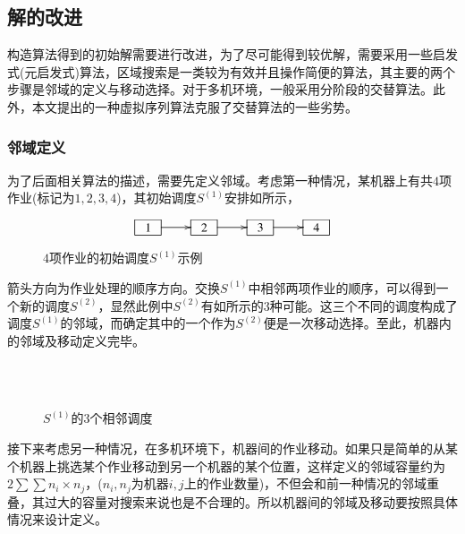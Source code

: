 \subsection{解的改进}
构造算法得到的初始解需要进行改进，为了尽可能得到较优解，需要采用一些启发式(元启发式)算法，区域搜索是一类较为有效并且操作简便的算法，其主要的两个步骤是邻域的定义与移动选择。对于多机环境，一般采用分阶段的交替算法。此外，本文提出的一种虚拟序列算法克服了交替算法的一些劣势。

\subsubsection{邻域定义}
为了后面相关算法的描述，需要先定义邻域。考虑第一种情况，某机器上有共$4$项作业(标记为$1,2,3,4$)，其初始调度$S^{(1)}$安排如所示，
\begin{figure}[h]
\begin{equation*}
\xymatrix{
\jobunit{1} \ar[r] & \jobunit{2} \ar[r] &\jobunit{3} \ar[r] &\jobunit{4}
}
\end{equation*}
\caption{$4$项作业的初始调度$S^{(1)}$示例\label{fig:4example}}
\end{figure}
箭头方向为作业处理的顺序方向。交换$S^{(1)}$中相邻两项作业的顺序，可以得到一个新的调度$S^{(2)}$，显然此例中$S^{(2)}$有如所示的$3$种可能。这三个不同的调度构成了调度$S^{(1)}$的邻域，而确定其中的一个作为$S^{(2)}$便是一次移动选择。至此，机器内的邻域及移动定义完毕。

\begin{figure}[h]
\centering
\vspace{1.5em}
\\
\\
\caption{$S^{(1)}$的$3$个相邻调度\label{fig:3neighbors}}
\end{figure}

接下来考虑另一种情况，在多机环境下，机器间的作业移动。如果只是简单的从某个机器上挑选某个作业移动到另一个机器的某个位置，这样定义的邻域容量约为$2\sum\sum n_i\times n_j$，($n_i,n_j$为机器$i,j$上的作业数量)，不但会和前一种情况的邻域重叠，其过大的容量对搜索来说也是不合理的。所以机器间的邻域及移动要按照具体情况来设计定义。

